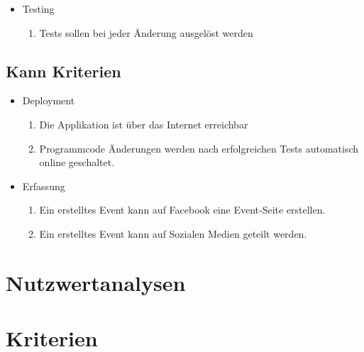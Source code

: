 \begin{itemize}
  \tightlist
  \item
        Testing
        \begin{enumerate}
          \def\labelenumi{\arabic{enumi}.}
          \tightlist
          \item
                Tests sollen bei jeder Änderung ausgelöst werden
        \end{enumerate}
\end{itemize}

\subsection{Kann Kriterien}\label{kann-kriterien}

\begin{itemize}
  \tightlist
  \item
        Deployment
        \begin{enumerate}
          \def\labelenumi{\arabic{enumi}.}
          \tightlist
          \item
                Die Applikation ist über das Internet erreichbar
          \item
                Programmcode Änderungen werden nach erfolgreichen Tests automatisch
                online geschaltet.
        \end{enumerate}
\end{itemize}

\begin{itemize}
  \tightlist
  \item
        Erfassung
        \begin{enumerate}
          \def\labelenumi{\arabic{enumi}.}
          \tightlist
          \item
                Ein erstelltes Event kann auf Facebook eine Event-Seite erstellen.
          \item
                Ein erstelltes Event kann auf Sozialen Medien geteilt werden.
        \end{enumerate}
\end{itemize}

\section{Nutzwertanalysen}\label{nutzwertanalysen}

\section{Kriterien}\label{kriterien}

